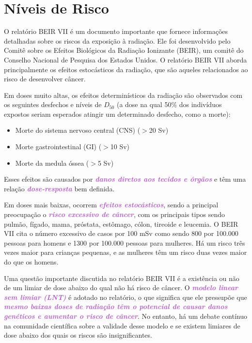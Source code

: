 \documentclass[11pt,a4paper]{article}
\begin{document}
\section{Níveis de Risco}

	O relatório BEIR VII é um documento importante que fornece informações detalhadas sobre os riscos da exposição à radiação. Ele foi desenvolvido pelo Comitê sobre os Efeitos Biológicos da Radiação Ionizante (BEIR), um comitê do Conselho Nacional de Pesquisa dos Estados Unidos. O relatório BEIR VII aborda principalmente os efeitos estocásticos da radiação, que são aqueles relacionados ao risco de desenvolver câncer.

	Em doses muito altas, os efeitos determinísticos da radiação são observados com os seguintes desfechos e níveis de $D_{50}$ (a dose na qual 50\% dos indivíduos expostos seriam esperados atingir um determinado desfecho, como a morte):

	\begin{itemize}
		\item Morte do sistema nervoso central (CNS) ($>$20 Sv)
		\item Morte gastrointestinal (GI) ($>$10 Sv)
		\item Morte da medula óssea ($>$5 Sv)
	\end{itemize}
	
	Esses efeitos são causados por \textcolor{MediumOrchid}{\textbf{\textit{danos diretos aos tecidos e órgãos}}} e têm uma relação \textcolor{MediumOrchid}{\textbf{\textit{dose-resposta}}} bem definida. 
	
	Em doses mais baixas, ocorrem \textcolor{MediumOrchid}{\textbf{\textit{efeitos estocásticos}}}, sendo a principal preocupação o \textcolor{MediumOrchid}{\textbf{\textit{risco excessivo de câncer}}}, com os principais tipos sendo pulmão, fígado, mama, próstata, estômago, cólon, tireoide e leucemia. O BEIR VII cita o número excessivo de casos por 100 mSv como sendo 800 por 100.000 pessoas para homens e 1300 por 100.000 pessoas para mulheres. Há um risco três vezes maior para crianças pequenas, e as mulheres têm um risco duas vezes maior do que os homens.

	Uma questão importante discutida no relatório BEIR VII é a existência ou não de um limiar de dose abaixo do qual não há risco de câncer. O \textcolor{MediumOrchid}{\textbf{\textit{modelo linear sem limiar (LNT)}}} é adotado no relatório, o que significa que ele pressupõe que \textcolor{MediumOrchid}{\textbf{\textit{mesmo baixas doses de radiação têm o potencial de causar danos genéticos e aumentar o risco de câncer}}}. No entanto, há um debate contínuo na comunidade científica sobre a validade desse modelo e se existem limiares de dose abaixo dos quais os riscos são insignificantes.
\end{document}
